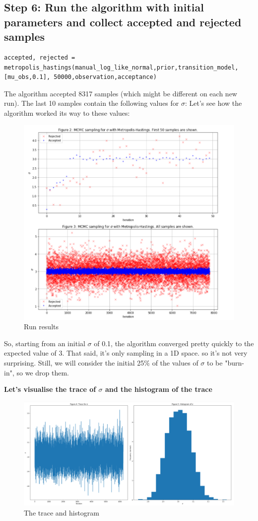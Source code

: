 \subsection{Step 6: Run the algorithm with initial parameters and collect accepted and rejected samples}

\begin{lstlisting}
accepted, rejected = metropolis_hastings(manual_log_like_normal,prior,transition_model,[mu_obs,0.1], 50000,observation,acceptance)
\end{lstlisting}

The algorithm accepted 8317 samples (which might be different on each new run). The last 10 samples contain the following values for $\sigma$:\newline
[2.87920187, 3.10388928, 2.94469786, 3.04094103, 2.95522153, 3.09328088, 3.07361275, 3.08588388, 3.12881964, 3.03651136]\newline
Let's see how the algorithm worked its way to these values:

\begin{figure}[h]
    \centering
\includegraphics[width=.6\textwidth]{pic/p05c09-snip03}
    \caption{Run results}
    \label{fig:p05c09-snip03}
\end{figure}

So, starting from an initial $\sigma$ of 0.1, the algorithm converged pretty quickly to the expected value of 3. That said, it's only sampling in a 1D space. so it's not very surprising.
Still, we will consider the initial 25\% of the values of $\sigma$ to be "burn-in", so we drop them.

\textbf{Let's visualise the trace of $\sigma$ and the histogram of the trace}


\begin{figure}[h]
    \centering
\includegraphics[width=.6\textwidth]{pic/p05c09-snip04}
    \caption{The trace and histogram}
    \label{fig:p05c09-snip04}
\end{figure}


